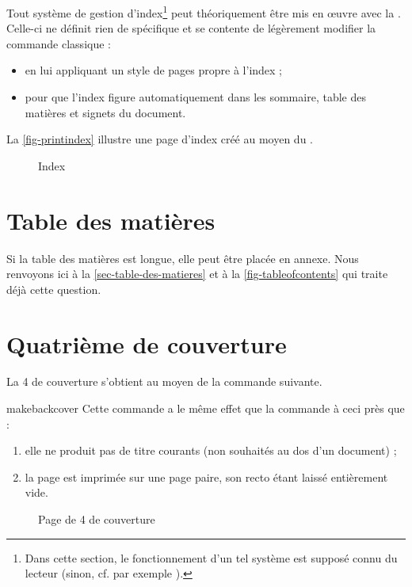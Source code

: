 Tout système de gestion d'index\footnote{Dans cette section, le fonctionnement
  d'un tel système est supposé connu du lecteur (sinon, cf. par exemple
  \cite{en-ligne7}).} peut théoriquement être mis en œuvre avec la
\yatCl. Celle-ci ne définit rien de spécifique et se contente de légèrement
modifier la commande  classique :
\begin{itemize}
\item en lui appliquant un style de pages propre à l'index ;
\item pour que l'index figure automatiquement dans les
  sommaire, table des matières et signets du document.
\end{itemize}

La \vref{fig-printindex} illustre une page d'index créé au moyen du
.

\begin{figure}[htbp]
  \centering
  \caption{Index}
  \label{fig-printindex}
\end{figure}

\section{Table des matières}
%

Si la table des matières est longue, elle peut être placée en
annexe. Nous renvoyons ici à la \vref{sec-table-des-matieres} et à
la \vref{fig-tableofcontents} qui traite déjà cette question.

\section{Quatrième de couverture}\label{sec-quatr-de-couv}
%
%

La 4\ieme{} de couverture s'obtient au moyen de la commande
 suivante.

\begin{docCommand}{makebackcover}{}
  Cette commande a le même effet que la commande 
  à ceci près que :
  \begin{enumerate}
  \item elle ne produit pas de titre courants (non souhaités au dos d'un
    document) ;
  \item la page est imprimée sur une page paire, son recto étant
    laissé entièrement vide.
  \end{enumerate}
\end{docCommand}

\begin{figure}[htbp]
  \centering
  \caption{Page de 4\ieme{} de couverture}
  \label{fig-makebackcover}
\end{figure}

